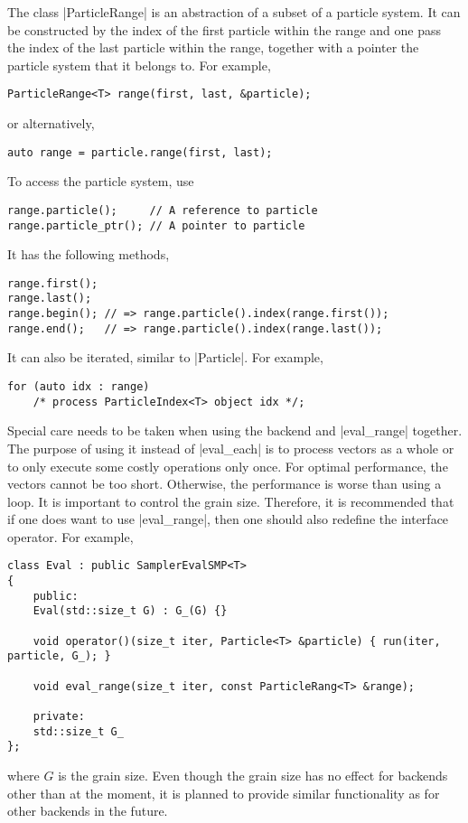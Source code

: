 The class |ParticleRange| is an abstraction of a subset of a particle system.
It can be constructed by the index of the first particle within the range and
one pass the index of the last particle within the range, together with a
pointer the particle system that it belongs to. For example,
\begin{verbatim}
ParticleRange<T> range(first, last, &particle);
\end{verbatim}
or alternatively,
\begin{verbatim}
auto range = particle.range(first, last);
\end{verbatim}
To access the particle system, use
\begin{verbatim}
range.particle();     // A reference to particle
range.particle_ptr(); // A pointer to particle
\end{verbatim}
It has the following methods,
\begin{verbatim}
range.first();
range.last();
range.begin(); // => range.particle().index(range.first());
range.end();   // => range.particle().index(range.last());
\end{verbatim}
It can also be iterated, similar to |Particle|. For example,
\begin{verbatim}
for (auto idx : range)
    /* process ParticleIndex<T> object idx */;
\end{verbatim}

Special care needs to be taken when using the \tbb backend and |eval_range|
together. The purpose of using it instead of |eval_each| is to process vectors
as a whole or to only execute some costly operations only once. For optimal
performance, the vectors cannot be too short. Otherwise, the performance is
worse than using a loop. It is important to control the grain size. Therefore,
it is recommended that if one does want to use |eval_range|, then one should
also redefine the interface operator. For example,
\begin{verbatim}
class Eval : public SamplerEvalSMP<T>
{
    public:
    Eval(std::size_t G) : G_(G) {}

    void operator()(size_t iter, Particle<T> &particle) { run(iter, particle, G_); }

    void eval_range(size_t iter, const ParticleRang<T> &range);

    private:
    std::size_t G_
};
\end{verbatim}
where $G$ is the grain size. Even though the grain size has no effect for
backends other than \tbb at the moment, it is planned to provide similar
functionality as \tbb for other backends in the future.

